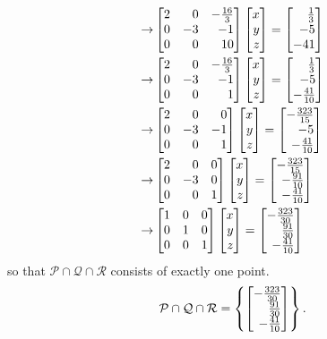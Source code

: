\begin{exercises}
\begin{problist}
\begin{solution}
\begin{align*}
				\rightarrow&\mat{2&0&-\frac{16}{3}\\0&-3&-1\\0&0&10}\mat{x\\y\\z}=\mat{\frac{1}{3}\\-5\\-41}\\
				\rightarrow&\mat{2&0&-\frac{16}{3}\\0&-3&-1\\0&0&1}\mat{x\\y\\z}=\mat{\frac{1}{3}\\-5\\-\frac{41}{10}}\\
				\rightarrow&\mat{2&0&0\\0&-3&-1\\0&0&1}\mat{x\\y\\z}=\mat{-\frac{323}{15}\\-5\\-\frac{41}{10}}\\
				\rightarrow&\mat{2&0&0\\0&-3&0\\0&0&1}\mat{x\\y\\z}=\mat{-\frac{323}{15}\\-\frac{91}{10}\\-\frac{41}{10}}\\
				\rightarrow&\mat{1&0&0\\0&1&0\\0&0&1}\mat{x\\y\\z}=\mat{-\frac{323}{30}\\ \frac{91}{30}\\-\frac{41}{10}}
			\end{align*}
			so that $\mathcal{P}\cap\mathcal{Q}\cap\mathcal{R}$ consists of exactly one point. 
			\[ \mathcal{P}\cap\mathcal{Q}\cap\mathcal{R}=\left\lbrace\mat{-\frac{323}{30}\\ \frac{91}{30}\\-\frac{41}{10}}\right\rbrace.\]
		\end{solution}	
	\end{problist}
\end{exercises}
